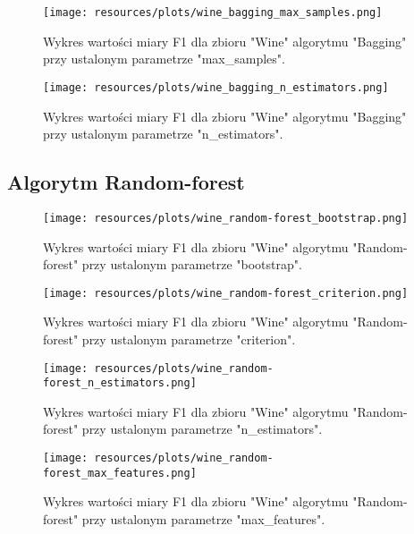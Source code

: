 
\begin{figure}[H]
    \center
    \texttt{[image: resources/plots/wine\_bagging\_max\_samples.png]}
    \caption{Wykres wartości miary F1 dla zbioru "Wine" algorytmu "Bagging" przy ustalonym parametrze "max\_samples".}
\end{figure}

\pagebreak
                    

\begin{figure}[H]
    \center
    \texttt{[image: resources/plots/wine\_bagging\_n\_estimators.png]}
    \caption{Wykres wartości miary F1 dla zbioru "Wine" algorytmu "Bagging" przy ustalonym parametrze "n\_estimators".}
\end{figure}

\pagebreak
                    
\subsection{Algorytm Random-forest}


\begin{figure}[H]
    \center
    \texttt{[image: resources/plots/wine\_random-forest\_bootstrap.png]}
    \caption{Wykres wartości miary F1 dla zbioru "Wine" algorytmu "Random-forest" przy ustalonym parametrze "bootstrap".}   
\end{figure}

\pagebreak
                    

\begin{figure}[H]
    \center
    \texttt{[image: resources/plots/wine\_random-forest\_criterion.png]}
    \caption{Wykres wartości miary F1 dla zbioru "Wine" algorytmu "Random-forest" przy ustalonym parametrze "criterion".}   
\end{figure}

\pagebreak
                    

\begin{figure}[H]
    \center
    \texttt{[image: resources/plots/wine\_random-forest\_n\_estimators.png]}
    \caption{Wykres wartości miary F1 dla zbioru "Wine" algorytmu "Random-forest" przy ustalonym parametrze "n\_estimators".}
\end{figure}                    
                    
\pagebreak


\begin{figure}[H]
    \center
    \texttt{[image: resources/plots/wine\_random-forest\_max\_features.png]}
    \caption{Wykres wartości miary F1 dla zbioru "Wine" algorytmu "Random-forest" przy ustalonym parametrze "max\_features".}
\end{figure}

\pagebreak
